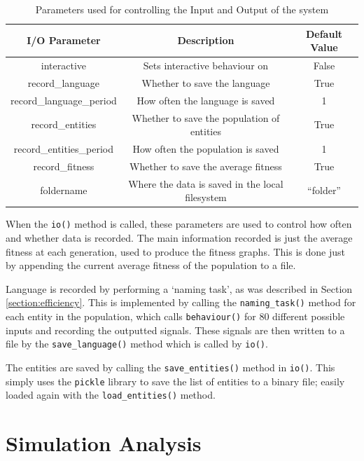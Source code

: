 \documentclass[12pt,a4paper]{report}
\begin{document}
\begin{table}[t]
\centering
 \begin{tabular}{ c | c | c}
 \bf{I/O Parameter} & \bf{Description} & \bf{Default Value} \\ [0.5ex] 
 \hline
interactive & Sets interactive behaviour on & False \\
record\_language & Whether to save the language & True \\
record\_language\_period & How often the language is saved & 1 \\
record\_entities & Whether to save the population of entities & True \\
record\_entities\_period & How often the population is saved & 1 \\
record\_fitness & Whether to save the average fitness & True \\
foldername & Where the data is saved in the local filesystem & ``folder'' \\
\end{tabular}
\caption{Parameters used for controlling the Input and Output of the system}
\label{table:io-params}
\end{table}

When the \texttt{io()} method is called, these parameters are used to control how often and whether data is recorded. The main information recorded is just the average fitness at each generation, used to produce the fitness graphs. This is done just by appending the current average fitness of the population to a file.

Language is recorded by performing a `naming task', as was described in Section \ref{section:efficiency}. This is implemented by calling the \texttt{naming\_task()} method for each entity in the population, which calls \texttt{behaviour()} for 80 different possible inputs and recording the outputted signals. These signals are then written to a file by the \texttt{save\_language()} method which is called by \texttt{io()}.

The entities are saved by calling the \texttt{save\_entities()} method in \texttt{io()}. This simply uses the \texttt{pickle} library to save the list of entities to a binary file; easily loaded again with the \texttt{load\_entities()} method.

\section{Simulation Analysis}\label{section:impl-analysis}
\end{document}
